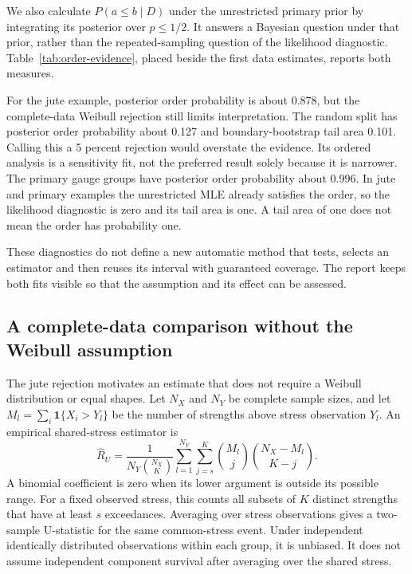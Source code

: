 We also calculate $P(a\le b\mid D)$ under the unrestricted primary prior by integrating its posterior over $p\le1/2$. It answers a Bayesian question under that prior, rather than the repeated-sampling question of the likelihood diagnostic. Table~\ref{tab:order-evidence}, placed beside the first data estimates, reports both measures.

For the jute example, posterior order probability is about 0.878, but the complete-data Weibull rejection still limits interpretation. The random split has posterior order probability about 0.127 and boundary-bootstrap tail area 0.101. Calling this a 5 percent rejection would overstate the evidence. Its ordered analysis is a sensitivity fit, not the preferred result solely because it is narrower. The primary gauge groups have posterior order probability about 0.996. In jute and primary examples the unrestricted MLE already satisfies the order, so the likelihood diagnostic is zero and its tail area is one. A tail area of one does not mean the order has probability one.

These diagnostics do not define a new automatic method that tests, selects an estimator and then reuses its interval with guaranteed coverage. The report keeps both fits visible so that the assumption and its effect can be assessed.


\FloatBarrier

\subsection{A complete-data comparison without the Weibull assumption}\label{sec:nonparametric}
The jute rejection motivates an estimate that does not require a Weibull distribution or equal shapes. Let $N_X$ and $N_Y$ be complete sample sizes, and let $M_l=\sum_i\mathbf1\{X_i>Y_l\}$ be the number of strengths above stress observation $Y_l$. An empirical shared-stress estimator is
\begin{equation}
\widehat R_U=\frac{1}{N_Y\binom{N_X}{K}}
\sum_{l=1}^{N_Y}\sum_{j=s}^K
\binom{M_l}{j}\binom{N_X-M_l}{K-j}.\label{eq:nonparametric}
\end{equation}
A binomial coefficient is zero when its lower argument is outside its possible range. For a fixed observed stress, this counts all subsets of $K$ distinct strengths that have at least $s$ exceedances. Averaging over stress observations gives a two-sample U-statistic for the same common-stress event. Under independent identically distributed observations within each group, it is unbiased. It does not assume independent component survival after averaging over the shared stress.

